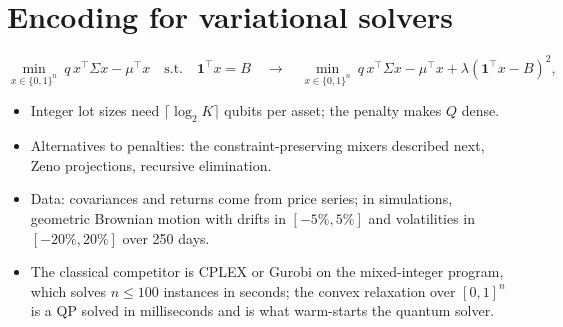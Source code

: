 \documentclass[handoutsbeamer.tex]{subfiles}
\begin{document}
\section{Encoding for variational solvers}

\begin{frame}
\onp{\footnotesize}
\begin{equation}\label{eq:ch13:qubo}
    \min_{x\in\{0,1\}^n}\ q\,x^\top\Sigma x - \mu^\top x\quad\text{s.t.}\quad \boldsymbol1^\top x = B
    \quad\longrightarrow\quad
    \min_{x\in\{0,1\}^n}\ q\,x^\top\Sigma x - \mu^\top x + \lambda(\boldsymbol1^\top x - B)^2,
\end{equation}
\begin{itemize}\setlength\itemsep{0.2em}
    \item Integer lot sizes need $\lceil\log_2 K\rceil$ qubits per asset; the penalty makes $Q$ dense.
    \item Alternatives to penalties: the constraint-preserving mixers described next, Zeno projections, recursive elimination.
    \item Data: covariances and returns come from price series; in simulations, geometric Brownian motion with drifts in $[-5\%,5\%]$ and volatilities in $[-20\%,20\%]$ over 250 days.
    \item The classical competitor is CPLEX or Gurobi on the mixed-integer program, which solves $n \le 100$ instances in seconds; the convex relaxation over $[0,1]^n$ is a QP solved in milliseconds and is what warm-starts the quantum solver.
\end{itemize}
\end{frame}
\end{document}
